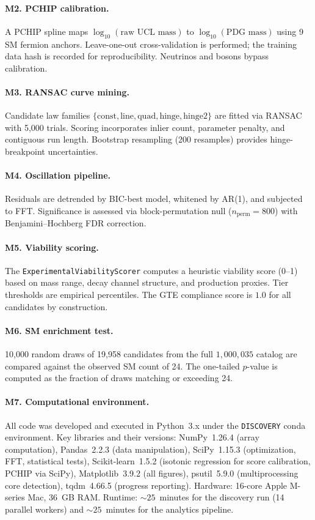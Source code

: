 \documentclass[12pt]{article}
\numberwithin{equation}{section}
\begin{document}
\paragraph{M2. PCHIP calibration.}
A PCHIP spline maps $\log_{10}(\text{raw UCL mass})$ to $\log_{10}(\text{PDG mass})$ using 9 SM fermion anchors. Leave-one-out cross-validation is performed; the training data hash is recorded for reproducibility. Neutrinos and bosons bypass calibration.

\paragraph{M3. RANSAC curve mining.}
Candidate law families $\{\text{const}, \text{line}, \text{quad}, \text{hinge}, \text{hinge2}\}$ are fitted via RANSAC with 5,000 trials. Scoring incorporates inlier count, parameter penalty, and contiguous run length. Bootstrap resampling (200 resamples) provides hinge-breakpoint uncertainties.

\paragraph{M4. Oscillation pipeline.}
Residuals are detrended by BIC-best model, whitened by AR(1), and subjected to FFT. Significance is assessed via block-permutation null ($n_{\text{perm}} = 800$) with Benjamini--Hochberg FDR correction.

\paragraph{M5. Viability scoring.}
The \texttt{ExperimentalViabilityScorer} computes a heuristic viability score (0--1) based on mass range, decay channel structure, and production proxies. Tier thresholds are empirical percentiles. The GTE compliance score is $1.0$ for all candidates by construction.

\paragraph{M6. SM enrichment test.}
10,000 random draws of 19,958 candidates from the full $1{,}000{,}035$ catalog are compared against the observed SM count of 24. The one-tailed $p$-value is computed as the fraction of draws matching or exceeding 24.

\paragraph{M7. Computational environment.}
All code was developed and executed in Python~3.x under the \texttt{DISCOVERY} conda environment. Key libraries and their versions: NumPy~1.26.4 (array computation), Pandas~2.2.3 (data manipulation), SciPy~1.15.3 (optimization, FFT, statistical tests), Scikit-learn~1.5.2 (isotonic regression for score calibration, PCHIP via SciPy), Matplotlib~3.9.2 (all figures), psutil~5.9.0 (multiprocessing core detection), tqdm~4.66.5 (progress reporting). Hardware: 16-core Apple M-series Mac, 36~GB RAM. Runtime: ${\sim}25$~minutes for the discovery run (14 parallel workers) and ${\sim}25$~minutes for the analytics pipeline.
\end{document}
